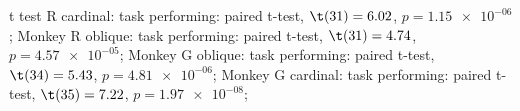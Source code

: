 t test \nMonkey R cardinal: task performing: paired t-test, $\t(31) = 6.02$, $p = \num{1.15e-06}$; 
Monkey R oblique: task performing: paired t-test, $\t(31) = 4.74$, $p = \num{4.57e-05}$; 
Monkey G oblique: task performing: paired t-test, $\t(34) = 5.43$, $p = \num{4.81e-06}$; 
Monkey G cardinal: task performing: paired t-test, $\t(35) = 7.22$, $p = \num{1.97e-08}$; 

